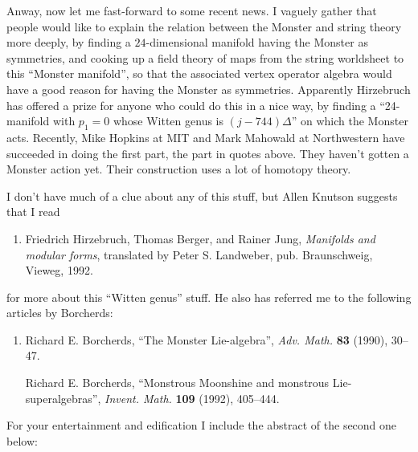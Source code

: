 \documentclass{article}
\def\tightlist{}
\begin{document}
Anway, now let me fast-forward to some recent news. I vaguely gather
that people would like to explain the relation between the Monster and
string theory more deeply, by finding a \(24\)-dimensional manifold
having the Monster as symmetries, and cooking up a field theory of maps
from the string worldsheet to this ``Monster manifold'', so that the
associated vertex operator algebra would have a good reason for having
the Monster as symmetries. Apparently Hirzebruch has offered a prize for
anyone who could do this in a nice way, by finding a ``24-manifold with
\(p_1=0\) whose Witten genus is \((j-744)\Delta\)'' on which the Monster
acts. Recently, Mike Hopkins at MIT and Mark Mahowald at Northwestern
have succeeded in doing the first part, the part in quotes above. They
haven't gotten a Monster action yet. Their construction uses a lot of
homotopy theory.

I don't have much of a clue about any of this stuff, but Allen Knutson
suggests that I read

\begin{enumerate}
\def\labelenumi{\arabic{enumi})}
\setcounter{enumi}{5}
\tightlist
\item
  Friedrich Hirzebruch, Thomas Berger, and Rainer Jung, \emph{Manifolds
  and modular forms}, translated by Peter S. Landweber, pub.
  Braunschweig, Vieweg, 1992.
\end{enumerate}

for more about this ``Witten genus'' stuff. He also has referred me to
the following articles by Borcherds:

\begin{enumerate}
\def\labelenumi{\arabic{enumi})}
\setcounter{enumi}{6}
\item
  Richard E. Borcherds, ``The Monster Lie-algebra'', \emph{Adv. Math.}
  \textbf{83} (1990), 30--47.

  Richard E. Borcherds, ``Monstrous Moonshine and monstrous
  Lie-superalgebras'', \emph{Invent. Math.} \textbf{109} (1992),
  405--444.
\end{enumerate}

For your entertainment and edification I include the abstract of the
second one below:
\end{document}
